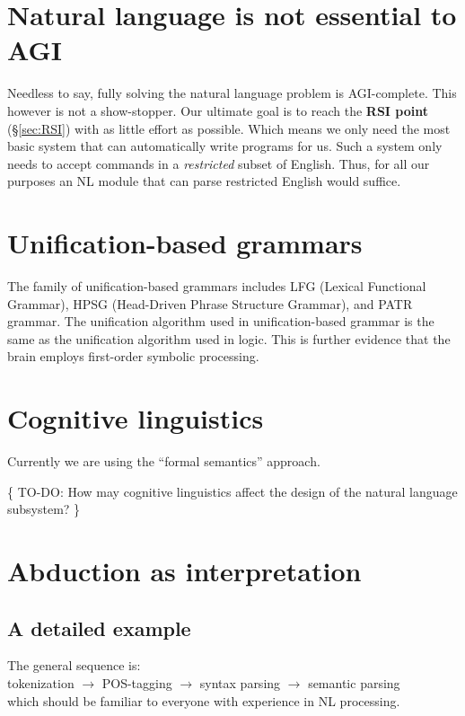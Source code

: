 \documentclass[a4paper]{report}
\begin{document}
\section{Natural language is not essential to AGI}

Needless to say, fully solving the natural language problem is AGI-complete.  This however is not a show-stopper.  Our ultimate goal is to reach the \textbf{RSI point} (\S\ref{sec:RSI}) with as little effort as possible.  Which means we only need the most basic system that can automatically write programs for us.  Such a system only needs to accept commands in a \textit{restricted} subset of English.  Thus, for all our purposes an NL module that can parse restricted English would suffice.

\section{Unification-based grammars}

The family of unification-based grammars includes LFG (Lexical Functional Grammar), HPSG (Head-Driven Phrase Structure Grammar), and PATR grammar.  The unification algorithm used in unification-based grammar is the same as the unification algorithm used in logic.  This is further evidence that the brain employs first-order symbolic processing.

\section{Cognitive linguistics}

Currently we are using the ``formal semantics'' approach.

\{ TO-DO:  How may cognitive linguistics affect the design of the natural language subsystem? \}

\section{Abduction as interpretation}
\label{sec:AbductionAsInterpretation}

\subsection{A detailed example}

The general sequence is:\\
\hspace*{1cm} tokenization $\rightarrow$ POS-tagging $\rightarrow$ syntax parsing $\rightarrow$ semantic parsing\\
which should be familiar to everyone with experience in NL processing.
\end{document}
